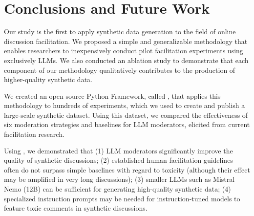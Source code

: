 %
\section{Conclusions and Future Work}

Our study is the first to apply synthetic data generation to the field of online discussion facilitation. We proposed a simple and generalizable methodology that enables researchers to inexpensively conduct pilot facilitation experiments using exclusively \acp{LLM}. We also conducted an ablation study to demonstrate that each component of our methodology qualitatively contributes to the production of higher-quality synthetic data.

We created an open-source Python Framework, called \syndisco, that applies this methodology to hundreds of experiments, which we used to create and publish \vmd a large-scale synthetic dataset. Using this dataset, we compared the effectiveness of six moderation strategies and baselines for \ac{LLM} moderators, elicited from current facilitation research. 

Using \syndisco, we demonstrated that (1) \ac{LLM} moderators significantly improve the quality of synthetic discussions; (2) established human facilitation guidelines often do not surpass simple baselines with regard to toxicity (although their effect may be amplified in very long discussions); (3) smaller \acp{LLM} such as Mistral Nemo (12B) can be sufficient for generating high-quality synthetic data; (4) specialized instruction prompts may be needed for instruction-tuned models to feature toxic comments in synthetic discussions. 